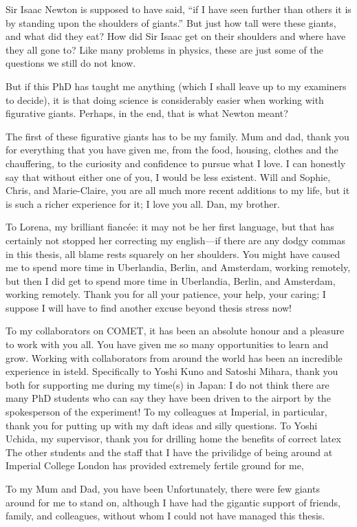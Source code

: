 \begin{acknowledgements}
Sir Isaac Newton is supposed to have said, ``if I have seen further than others it is by standing upon the shoulders of giants.''  
But just how tall were these giants, and what did they eat?  
How did Sir Isaac get on their shoulders and where have they all gone to?
Like many problems in physics, these are just some of the questions we still do not know.

But if this PhD has taught me anything (which I shall leave up to my examiners to decide), it is that doing science is considerably easier when working with figurative giants.
Perhaps, in the end, that is what Newton meant?  

The first of these figurative giants has to be my family.
Mum and dad, thank you for everything that you have given me, from the food, housing, clothes and the chauffering, to the curiosity and confidence to pursue what I love.
I can honestly say that without either one of you, I would be less existent.
Will and Sophie, Chris, and Marie-Claire, you are all much more recent additions to my life, but it is such a richer experience for it; I love you all.
Dan, my brother.

To Lorena, my brilliant fianc\'{e}e:
it may not be her first language, but that has certainly not stopped her correcting my english---if there are any dodgy commas in this thesis, all blame rests squarely on her shoulders.
You might have caused me to spend more time in Uberlandia, Berlin, and Amsterdam, working remotely, but then I did get to spend more time in Uberlandia, Berlin, and Amsterdam, working remotely.
Thank you for all your patience, your help, your caring; I suppose I will have to find another excuse beyond thesis stress now!

To my collaborators on COMET, it has been an absolute honour and a pleasure to work with you all.
You have given me so many opportunities to learn and grow.  
Working with collaborators from around the world has been an incredible experience in isteld.
Specifically to Yoshi Kuno and Satoshi Mihara, thank you both for supporting me during my time(s) in Japan:
I do not think there are many PhD students who can say they have been driven to the airport by the spokesperson of the experiment!
To my colleagues at Imperial, in particular, thank you for putting up with my daft ideas and silly questions.
To Yoshi Uchida, my supervisor, thank you for drilling home the benefits of correct latex
The other students and the staff that I have the privilidge of being around at 
Imperial College London has provided extremely fertile ground for me, 


To my Mum and Dad, you have been 
Unfortunately, there were few giants around for me to stand on, although I have had the gigantic support of friends, family, and colleagues, without whom I could not have managed this thesis.

\end{acknowledgements}


